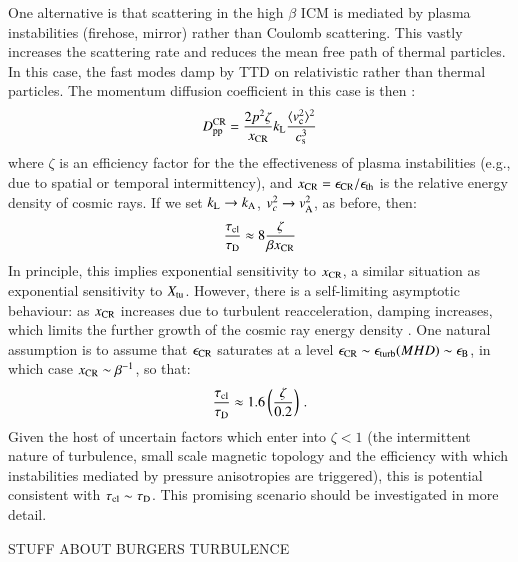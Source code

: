 \documentclass[fleqn,usenatbib,useAMS]{mnras}
\begin{document}
One alternative is that scattering in the high $\beta$ ICM is mediated by plasma instabilities (firehose, mirror) rather than Coulomb scattering. This vastly increases the scattering rate and reduces the mean free path of thermal particles. In this case, the fast modes damp by TTD on relativistic rather than thermal particles. The momentum diffusion coefficient in this case is then \citep{brunetti11, miniati15}:
\begin{equation}
D_{\rm pp}^{\rm CR} = \frac{2 p^{2} \zeta}{x_{\rm CR}} k_{\rm L} \frac{\langle v_{\rm c}^{2} \rangle^{2}}{c_{\rm s}^{3}}
\end{equation}
where $\zeta$ is an efficiency factor for the the effectiveness of plasma instabilities (e.g., due to spatial or temporal intermittency), and $x_{\rm CR}=\epsilon_{\rm CR}/\epsilon_{\rm th}$ is the relative energy density of cosmic rays. If we set $k_{\rm L} \rightarrow k_{\rm A}$, $v_{c}^{2} \rightarrow v_{\rm A}^{2}$, as before, then: 
\begin{equation}
\frac{\tau_{\rm cl}}{\tau_{\rm D}} \approx 8 \frac{\zeta}{\beta x_{\rm CR}}
\end{equation}
In principle, this implies exponential sensitivity to $x_{\rm CR}$, a similar situation as exponential sensitivity to $X_{\rm tu}$. However, there is a self-limiting asymptotic behaviour: as $x_{\rm CR}$ increases due to turbulent reacceleration, damping increases, which limits the further growth of the cosmic ray energy density \citep{brunetti11}. One natural assumption is to assume that $\epsilon_{\rm CR}$ saturates at a level $\epsilon_{\rm CR} \sim \epsilon_{\rm turb} (MHD) \sim \epsilon_{\rm B}$, in which case $x_{\rm CR} \sim \beta^{-1}$, so that: 
\begin{equation}
\frac{\tau_{\rm cl}}{\tau_{\rm D}} \approx 1.6 \left(\frac{\zeta}{0.2}\right)\,.
\end{equation}
Given the host of uncertain factors which enter into $\zeta < 1$ (the intermittent nature of turbulence, small scale magnetic topology and the efficiency with which instabilities mediated by pressure anisotropies are triggered), this is potential consistent with $\tau_{\rm cl} \sim \tau_{\rm D}$. This promising scenario should be investigated in more detail. 

STUFF ABOUT BURGERS TURBULENCE
\end{document}
